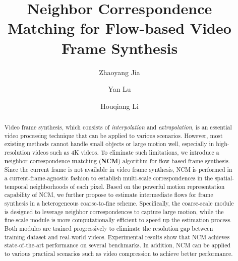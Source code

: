 \documentclass[sigconf]{acmart}
\begin{document}
\title{Neighbor Correspondence Matching for Flow-based Video Frame Synthesis}



\author{Zhaoyang Jia}

\author{Yan Lu}

\author{Houqiang Li}




\renewcommand{\shortauthors}{Zhaoyang Jia et al.}

\begin{abstract}
Video frame synthesis, which consists of \textit{interpolation} and \textit{extrapolation}, is an essential video processing technique that can be applied to various scenarios. However, most existing methods cannot handle small objects or large motion well, especially in high-resolution videos such as 4K videos. To eliminate such limitations, we introduce a \textbf{n}eighbor \textbf{c}orrespondence \textbf{m}atching (\textbf{NCM}) algorithm for flow-based frame synthesis. Since the current frame is not available in video frame synthesis, NCM is performed in a current-frame-agnostic fashion to establish multi-scale correspondences in the spatial-temporal neighborhoods of each pixel. Based on the powerful motion representation capability of NCM, we further propose to estimate intermediate flows for frame synthesis in a heterogeneous coarse-to-fine scheme. Specifically, the coarse-scale module is designed to leverage neighbor correspondences to capture large motion, while the fine-scale module is more computationally efficient to speed up the estimation process. Both modules are trained progressively to eliminate the resolution gap between training dataset and real-world videos. Experimental results show that NCM achieves state-of-the-art performance on several benchmarks. In addition, NCM can be applied to various practical scenarios such as video compression to achieve better performance.
\end{abstract}
\end{document}

